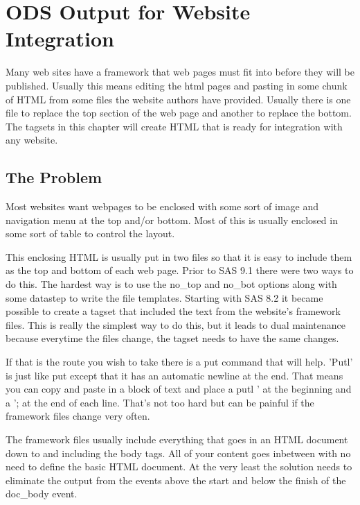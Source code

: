 \chapter{ODS Output for Website Integration}
Many web sites have a framework that web pages must fit into 
before they will be published.  Usually this means
editing the html pages and pasting in some chunk of HTML from
some files the website authors have provided.
Usually there is one file to replace the top section of the
web page and another to replace the bottom.  
The tagsets in this chapter will create HTML that
is ready for integration with any website.  

\section{The Problem}
Most websites want webpages to be enclosed with some sort of
image and navigation menu at the top and/or bottom.  Most of this
is usually enclosed in some sort of table to control the layout.

This enclosing HTML is usually put in two files so that it is easy
to include them as the top and bottom of each web page.  Prior to
SAS 9.1 there were two ways to do this.  The hardest way is to use
the no\_top and no\_bot options along with some datastep to write
the file templates.  Starting with SAS 8.2 it became possible to
create a tagset that included the text from the website's framework
files.  This is really the simplest way to do this, but it leads
to dual maintenance because everytime the files change, the tagset
needs to have the same changes.

If that is the route you wish to take there is a put command that
will help.  'Putl' is just like put except that it has an automatic
newline at the end.  That means you can copy and paste in a block
of text and place a putl ' at the beginning and a '; at the end of
each line.  That's not too hard but can be painful if the framework
files change very often.

The framework files usually include everything that goes in an HTML
document down to and including the body tags.  All of your content
goes inbetween with no need to define the basic HTML document.  At
the very least the solution needs to eliminate the output from the
events above the start and below the finish of the doc\_body event.

